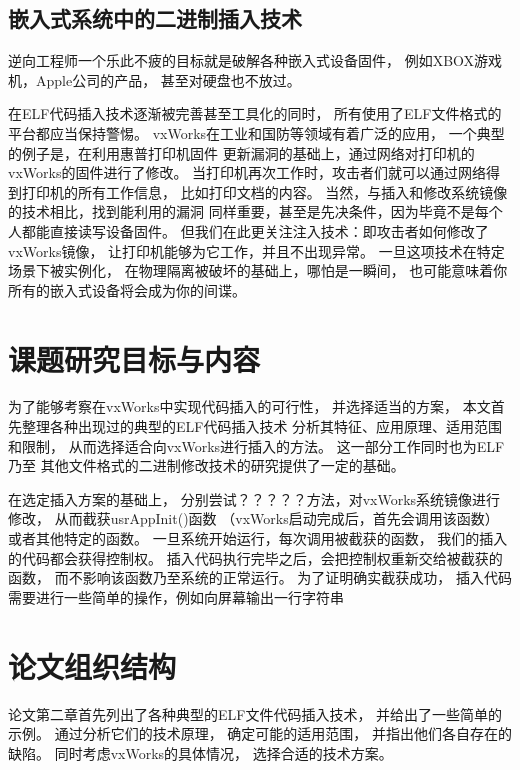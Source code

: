 \subsection{嵌入式系统中的二进制插入技术}

逆向工程师一个乐此不疲的目标就是破解各种嵌入式设备固件，
例如XBOX游戏机，Apple公司的产品，
甚至对硬盘也不放过。


在ELF代码插入技术逐渐被完善甚至工具化的同时，
所有使用了ELF文件格式的平台都应当保持警惕。
vxWorks在工业和国防等领域有着广泛的应用，
一个典型的例子是\cite{printme}，在利用惠普打印机固件
更新漏洞的基础上，通过网络对打印机的vxWorks的固件进行了修改。
当打印机再次工作时，攻击者们就可以通过网络得到打印机的所有工作信息，
比如打印文档的内容。
当然，与插入和修改系统镜像的技术相比，找到能利用的漏洞
同样重要，甚至是先决条件，因为毕竟不是每个人都能直接读写设备固件。
但我们在此更关注注入技术：即攻击者如何修改了vxWorks镜像，
让打印机能够为它工作，并且不出现异常。
一旦这项技术在特定场景下被实例化，
在物理隔离被破坏的基础上，哪怕是一瞬间，
也可能意味着你所有的嵌入式设备将会成为你的间谍。

\section{课题研究目标与内容}

为了能够考察在vxWorks中实现代码插入的可行性，
并选择适当的方案，
本文首先整理各种出现过的典型的ELF代码插入技术
分析其特征、应用原理、适用范围和限制，
从而选择适合向vxWorks进行插入的方法。
这一部分工作同时也为ELF乃至
其他文件格式的二进制修改技术的研究提供了一定的基础。


在选定插入方案的基础上，
分别尝试？？？？？方法，对vxWorks系统镜像进行修改，
从而截获usrAppInit()函数
（vxWorks启动完成后，首先会调用该函数）
或者其他特定的函数。
一旦系统开始运行，每次调用被截获的函数，
我们的插入的代码都会获得控制权。
插入代码执行完毕之后，会把控制权重新交给被截获的函数，
而不影响该函数乃至系统的正常运行。
为了证明确实截获成功，
插入代码需要进行一些简单的操作，例如向屏幕输出一行字符串

\section{论文组织结构}

论文第二章首先列出了各种典型的ELF文件代码插入技术，
并给出了一些简单的示例。
通过分析它们的技术原理，
确定可能的适用范围，
并指出他们各自存在的缺陷。
同时考虑vxWorks的具体情况，
选择合适的技术方案。

